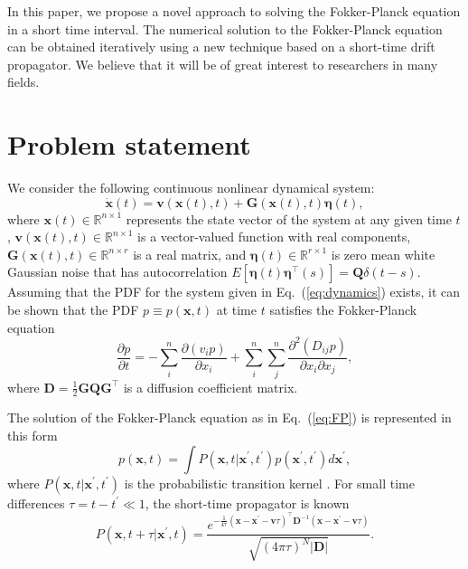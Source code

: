 \documentclass[aps,pre,reprint,superscriptaddress,showpacs,amsmath
,floatfix
]{revtex4-2}
\renewcommand{\vec}[1]{\boldsymbol{#1}}
\newcommand{\mat}[1]{\textbf{#1}}
\newcommand{\eq}[1]{Eq.~(\ref{#1})}
\begin{document}
 In this paper, we propose a novel approach to solving the Fokker-Planck equation in a short time interval. The numerical solution to the Fokker-Planck equation can be obtained iteratively using a new technique based on a short-time drift propagator. We believe that it will be of great interest to researchers in many fields.

\section{Problem statement}
We consider the following continuous nonlinear dynamical system:
\begin{equation}\label{eq:dynamics}
    \dot{\vec{x}}(t) = \vec{v}(\vec{x}(t),t) + \mat{G}(\vec{x}(t),t)\vec{\eta}(t),
\end{equation}
where $\vec{x}(t) \in \mathbb{R}^{n\times 1}$ represents the state vector of the system at any given time $t$, $\vec{v}(\vec{x}(t),t) \in \mathbb{R}^{n\times 1}$ is a vector-valued function with real components, $\mat{G}(\vec{x}(t),t) \in \mathbb{R}^{n\times r}$ is a real matrix, and $\vec{\eta}(t) \in \mathbb{R}^{r\times 1}$ is zero mean white Gaussian noise that has autocorrelation $E[\vec{\eta}(t)\vec{\eta}^\top(s)] = \mat{Q}\delta(t-s)$. Assuming that the PDF for the system given in \eq{eq:dynamics} exists, it can be shown that the PDF $p \equiv p(\vec{x},t)$ at time $t$ satisfies the Fokker-Planck equation \cite{risken1996fokker, frank2005nonlinear}
\begin{equation}
\label{eq:FP}
\frac{\partial p}{\partial t} = -\sum_{i}^{n} \frac{\partial (v_i p)}{\partial x_i} + \sum_{i}^{n} \sum_{j}^{n} \frac{\partial^2 (D_{ij} p)}{\partial x_i\partial x_j},
\end{equation}
where $\mat{D} = \frac{1}{2}\mat{G}\mat{Q}\mat{G}^\top$ is a diffusion coefficient matrix. 

The solution of the Fokker-Planck equation as in \eq{eq:FP} is represented in this form \cite{risken1996fokker, frank2005nonlinear}
\begin{equation}
\label{eq:FP_int_sol}
p(\vec{x},t) = \int P(\vec{x},t|\vec{x}^\prime,t^\prime)p(\vec{x}^\prime,t^\prime) d\vec{x}^\prime,
\end{equation}
where $P(\vec{x},t|\vec{x}^\prime,t^\prime)$ is the probabilistic transition kernel \cite{risken1996fokker, frank2005nonlinear}. For small time differences $\tau=t-t^\prime \ll 1$, the short-time propagator is known
\begin{equation}
\label{eq:propagator_old}
P(\vec{x},t+\tau|\vec{x}^\prime,t) = \frac{ e^{-\frac{1}{4\tau} (\vec{x}-\vec{x}^\prime-\vec{v}\tau)^\top \mat{D}^{-1} (\vec{x}-\vec{x}^\prime-\vec{v}\tau)} }{\sqrt{(4\pi\tau)^N |\mat{D}|}} .
\end{equation}
\end{document}
